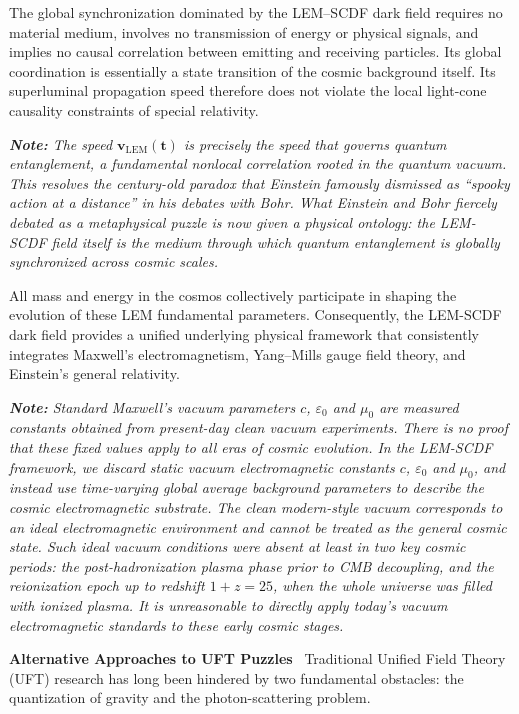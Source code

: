 \documentclass[12pt,leqno]{article}
\begin{document}
	\medskip
	The global synchronization dominated by the LEM--SCDF dark field requires no material medium, involves no transmission of energy or physical signals, and implies no causal correlation between emitting and receiving particles. Its global coordination is essentially a state transition of the cosmic background itself. Its superluminal propagation speed therefore does not violate the local light-cone causality constraints of special relativity.
	
	\medskip
	\textit{\textbf{Note:} The speed $\boldsymbol{v_{\scriptscriptstyle\mathrm{LEM}}(t)}$ is precisely the speed that governs quantum entanglement, a fundamental nonlocal correlation rooted in the quantum vacuum. This resolves the century-old paradox that Einstein famously dismissed as ``spooky action at a distance'' in his debates with Bohr. What Einstein and Bohr fiercely debated as a metaphysical puzzle is now given a physical ontology: the LEM-SCDF field itself is the medium through which quantum entanglement is globally synchronized across cosmic scales.}
	
	\medskip
	All mass and energy in the cosmos collectively participate in shaping the evolution of these LEM fundamental parameters. Consequently, the LEM-SCDF dark field provides a unified underlying physical framework that consistently integrates Maxwell's electromagnetism, Yang--Mills gauge field theory, and Einstein's general relativity.
	
	
	\bigskip
	\textit{\textbf{Note:} Standard Maxwell’s vacuum parameters $c$, $\varepsilon_0$ and $\mu_0$ are measured constants obtained from present-day clean vacuum experiments. There is no proof that these fixed values apply to all eras of cosmic evolution. In the LEM-SCDF framework, we discard static vacuum electromagnetic constants $c$, $\varepsilon_0$ and $\mu_0$, and instead use time-varying global average background parameters to describe the cosmic electromagnetic substrate. The clean modern-style vacuum corresponds to an ideal electromagnetic environment and cannot be treated as the general cosmic state. Such ideal vacuum conditions were absent at least in two key cosmic periods: the post-hadronization plasma phase prior to CMB decoupling, and the reionization epoch up to redshift $1+z=25$, when the whole universe was filled with ionized plasma. It is unreasonable to directly apply today’s vacuum electromagnetic standards to these early cosmic stages.}
	
	
	
	\medskip
	\bigskip
	\textbf{Alternative Approaches to UFT Puzzles}\,\,\,
	Traditional Unified Field Theory (UFT) research has long been hindered by two fundamental obstacles: the quantization of gravity and the photon-scattering problem. 
	
\end{document}
